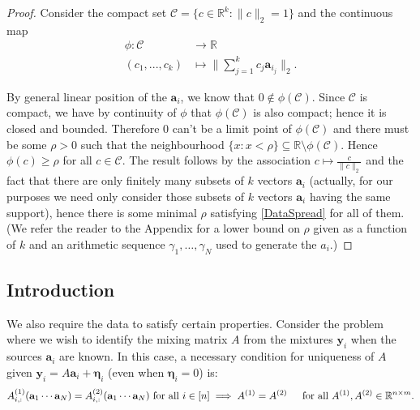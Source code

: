 \documentclass[journal, onecolumn]{IEEEtran}
\begin{document}
\begin{proof}
Consider the compact set $\mathcal{C} = \{c \in \mathbb{R}^k: \|c\|_2 = 1\}$ and the continuous map
\begin{align*}
\phi: \mathcal{C} &\to \mathbb{R} \\
(c_1, ..., c_k) &\mapsto \|\sum_{j = 1}^k c_j \mathbf{a}_{i_j}\|_2.
\end{align*}

By general linear position of the $\mathbf{a}_i$, we know that $0 \notin \phi(\mathcal{C})$. Since $\mathcal{C}$ is compact, we have by continuity of $\phi$ that $\phi(\mathcal{C})$ is also compact; hence it is closed and bounded. Therefore $0$ can't be a limit point of $\phi(\mathcal{C})$ and there must be some $\rho > 0$ such that the neighbourhood $\{x: x < \rho\} \subseteq \mathbb{R} \setminus \phi(\mathcal{C})$. Hence $\phi(c) \geq \rho$ for all $c \in \mathcal{C}$. The result follows by the association $c \mapsto \frac{c}{\|c\|_2}$ and the fact that there are only finitely many subsets of $k$ vectors $\mathbf{a}_i$ (actually, for our purposes we need only consider those subsets of $k$ vectors $\mathbf{a}_i$ having the same support), hence there is some minimal $\rho$ satisfying \eqref{DataSpread} for all of them. (We refer the reader to the Appendix for a lower bound on $\rho$ given as a function of $k$ and an arithmetic sequence $\gamma_1, \ldots, \gamma_N$ used to generate the $a_i$.)
\end{proof}


      
\subsection{Introduction}

We also require the data to satisfy certain properties. Consider the problem where we wish to identify the mixing matrix $A$ from the mixtures $\mathbf{y}_i$ when the sources $\mathbf{a}_i$ are known. In this case, a necessary condition for uniqueness of $A$ given $\mathbf{y}_i = A \mathbf{a}_i + \mathbf{\eta}_i$ (even when $\mathbf{\eta}_i=0$) is:
\begin{align}\label{SparkCondition2}
A^{(1)}_{i,:}(\mathbf{a}_1 \cdots \mathbf{a}_N) = A^{(2)}_{i,:}(\mathbf{a}_1 \cdots \mathbf{a}_N)  \text{ for all } i \in [n] \implies A^{(1)}  = A^{(2)} \indent \text{for all } A^{(1)}, A^{(2)} \in \mathbb{R}^{n \times m}.
\end{align}
\end{document}
